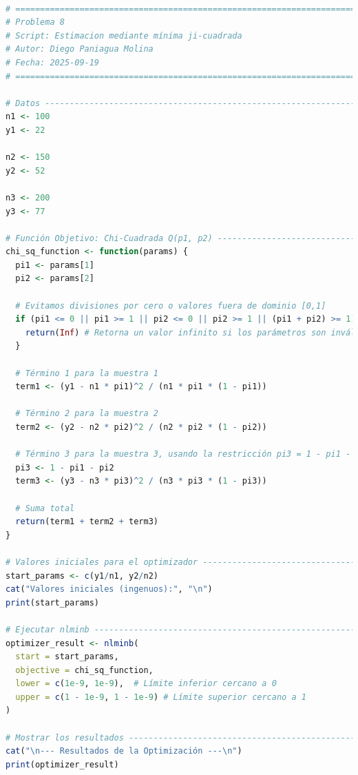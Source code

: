 \begin{lstlisting}[language=R, caption={Script: Estimacion mediante mínima ji-cuadrada.}, label={lst:script8}]

# =============================================================================
# Problema 8
# Script: Estimacion mediante mínima ji-cuadrada
# Autor: Diego Paniagua Molina
# Fecha: 2025-09-19
# =============================================================================

# Datos -----------------------------------------------------------------------
n1 <- 100
y1 <- 22

n2 <- 150
y2 <- 52

n3 <- 200
y3 <- 77

# Función Objetivo: Chi-Cuadrada Q(p1, p2) ------------------------------------
chi_sq_function <- function(params) {
  pi1 <- params[1]
  pi2 <- params[2]
  
  # Evitamos divisiones por cero o valores fuera de dominio [0,1]
  if (pi1 <= 0 || pi1 >= 1 || pi2 <= 0 || pi2 >= 1 || (pi1 + pi2) >= 1) {
    return(Inf) # Retorna un valor infinito si los parámetros son inválidos
  }
  
  # Término 1 para la muestra 1
  term1 <- (y1 - n1 * pi1)^2 / (n1 * pi1 * (1 - pi1))
  
  # Término 2 para la muestra 2
  term2 <- (y2 - n2 * pi2)^2 / (n2 * pi2 * (1 - pi2))
  
  # Término 3 para la muestra 3, usando la restricción pi3 = 1 - pi1 - pi2
  pi3 <- 1 - pi1 - pi2
  term3 <- (y3 - n3 * pi3)^2 / (n3 * pi3 * (1 - pi3))
  
  # Suma total
  return(term1 + term2 + term3)
}

# Valores iniciales para el optimizador ---------------------------------------
start_params <- c(y1/n1, y2/n2)
cat("Valores iniciales (ingenuos):", "\n")
print(start_params)

# Ejecutar nlminb -------------------------------------------------------------
optimizer_result <- nlminb(
  start = start_params,
  objective = chi_sq_function,
  lower = c(1e-9, 1e-9),  # Límite inferior cercano a 0
  upper = c(1 - 1e-9, 1 - 1e-9) # Límite superior cercano a 1
)

# Mostrar los resultados ------------------------------------------------------
cat("\n--- Resultados de la Optimización ---\n")
print(optimizer_result)

\end{lstlisting}

